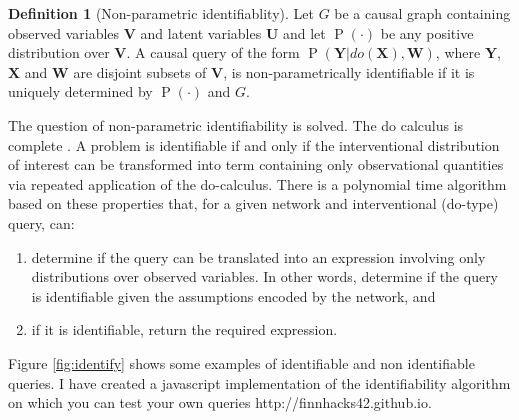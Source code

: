 \documentclass[11pt,a4paper,oneside]{book}
\renewcommand{\P}[1]{\operatorname{P}\left(#1\right)}
\theoremstyle{plain}
\theoremstyle{definition}
\newtheorem{definition}[theorem]{Definition}
\begin{document}
\vspace*{.3cm}
\begin{definition}[Non-parametric identifiablity]
Let $G$ be a causal graph containing observed variables $\boldsymbol{V}$ and latent variables $\boldsymbol{U}$ and let $\P{\cdot}$ be any positive distribution over $\boldsymbol{V}$. A causal query of the form $\P{\boldsymbol{Y}|do(\boldsymbol{X}),\boldsymbol{W}}$, where $\boldsymbol{Y}$,$\boldsymbol{X}$ and $\boldsymbol{W}$ are disjoint subsets of $\boldsymbol{V}$, is non-parametrically identifiable if it is uniquely determined by $\P{\cdot}$ and $G$.
\end{definition} 

The question of non-parametric identifiability is solved. The do calculus is complete \citep{Shpitser2006b,Huang2006}. A problem is identifiable if and only if the interventional distribution of interest can be transformed into term containing only observational quantities via repeated application of the do-calculus. There is a polynomial time algorithm \citep{Shpitser2006a} based on these properties that, for a given network and interventional (do-type) query, can:

\begin{enumerate}
\item determine if the query can be translated into an expression involving only distributions over observed variables. In other words, determine if the query is identifiable given the assumptions encoded by the network, and
\item if it is identifiable, return the required expression. 
\end{enumerate}

Figure \ref{fig:identify} shows some examples of identifiable and non identifiable queries. I have created a javascript implementation of the identifiability algorithm \citep{Shpitser2006a} on which you can test your own queries http://finnhacks42.github.io.
\end{document}
